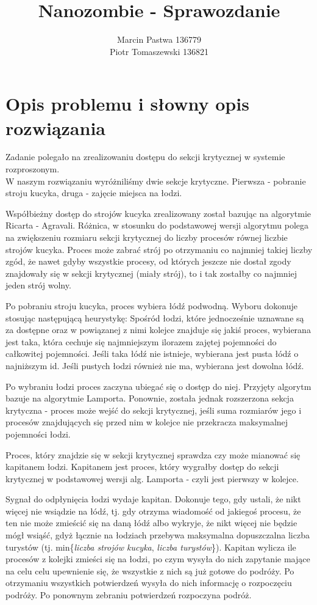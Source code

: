 \documentclass[a4paper]{article}
\title{Nanozombie - Sprawozdanie}
\author{Marcin Pastwa 136779\\
Piotr Tomaszewski 136821 }
\date{}
\begin{document}
\maketitle
\section{Opis problemu i słowny opis rozwiązania}
\linenumbers
Zadanie polegało na zrealizowaniu dostępu do sekcji krytycznej w systemie rozproszonym.\\
W naszym rozwiązaniu wyróżniliśmy dwie sekcje krytyczne. Pierwsza - pobranie stroju kucyka, druga - zajęcie miejsca na łodzi.

Współbieżny dostęp do strojów kucyka zrealizowany został bazując na algorytmie Ricarta - Agravali. Różnica, w stosunku do podstawowej wersji algorytmu
polega na zwiększeniu rozmiaru sekcji krytycznej do liczby procesów równej liczbie strojów kucyka.
Proces może zabrać strój po otrzymaniu co najmniej takiej liczby zgód, że nawet gdyby wszystkie procesy, od których jeszcze
nie dostał zgody znajdowały się w sekcji krytycznej (miały strój), to i tak zostałby co najmniej jeden strój wolny.

Po pobraniu stroju kucyka, proces wybiera łódź podwodną. Wyboru dokonuje stosując następującą heurystykę: Spośród łodzi, które jednocześnie uznawane są za dostępne oraz w powiązanej z nimi kolejce znajduje się jakiś proces,
wybierana jest taka, która cechuje się najmniejszym ilorazem zajętej pojemności do całkowitej pojemności. Jeśli taka łódź nie istnieje, wybierana jest pusta łódź o najniższym id. Jeśli pustych łodzi również nie ma, wybierana jest dowolna łódź.

Po wybraniu łodzi proces zaczyna ubiegać się o dostęp do niej. Przyjęty algorytm bazuje na algorytmie Lamporta. Ponownie, została jednak rozszerzona sekcja krytyczna - proces może wejść do sekcji krytycznej, jeśli suma rozmiarów jego i procesów
znajdujących się przed nim w kolejce nie przekracza maksymalnej pojemności łodzi.

Proces, który znajdzie się w sekcji krytycznej sprawdza czy może mianować się kapitanem łodzi. Kapitanem jest proces, który wygrałby dostęp do sekcji krytycznej w podstawowej wersji alg. Lamporta - czyli jest pierwszy w kolejce.

Sygnał do odpłynięcia łodzi wydaje kapitan. Dokonuje tego, gdy ustali, że nikt więcej nie wsiądzie na łódź, tj. gdy otrzyma wiadomość od jakiegoś procesu, że ten nie może zmieścić się na daną łódź albo wykryje, że nikt więcej nie będzie mógł wsiąść, gdyż łącznie na łodziach przebywa maksymalna dopuszczalna liczba turystów (tj. min\{\textit{liczba strojów kucyka}, \textit{liczba turystów}\}).
Kapitan wylicza ile procesów z kolejki zmieści się na łodzi, po czym wysyła do nich zapytanie mające na celu celu upewnienie się, że wszystkie z nich są już gotowe do podróży. Po otrzymaniu wszystkich potwierdzeń wysyła do nich informację o rozpoczęciu podróży.
Po ponownym zebraniu potwierdzeń rozpoczyna podróż.
\end{document}
